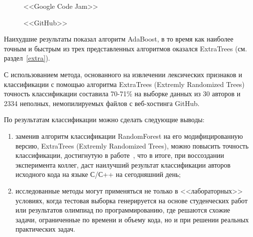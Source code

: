 \begin{figure}[h!]
\caption{ <<Google Code Jam>> }
\label{google:google}
\end{figure}

\begin{figure}[h!]
\caption{ <<GitHub>> }
\label{github:github}
\end{figure}

Наихудшие результаты показал алгоритм AdaBoost, в то время как наиболее точным и быстрым из трех 
представленных алгоритмов оказался ExtraTrees (см. раздел~\ref{extra}). 

С использованием метода, основанного на извлечении лексических признаков и классификации с помощью алгоритма 
ExtraTrees (Extremly Randomized Trees) точность классификации составила 70-71\% на выборке данных из 30 авторов
и 2334 неполных, немопилируемых файлов с веб-хостинга GitHub. 

По результатам классификации можно сделать следующие выводы:
\begin{enumerate}
 \item заменив алгоритм классификации RandomForest
 на его модифицированную версию, ExtraTrees (Extremly Randomized Trees),
 можно повысить точность классификации, достигнутую в работе~\cite{git_blame},
 что в итоге, при воссоздании эксперимента коллег, даст наилучший результат классификации
 авторов исходного кода на языке С/С++ на сегодняшний день;
 \item исследованные методы могут применяться не только в <<лабораторных>> условиях, когда
тестовая выборка генерируется на основе студенческих работ или результатов олимпиад по программированию,
где решаются схожие задачи, ограниченные по времени и объему кода, но и при решении реальных практических задач.
\end{enumerate}


\clearpage